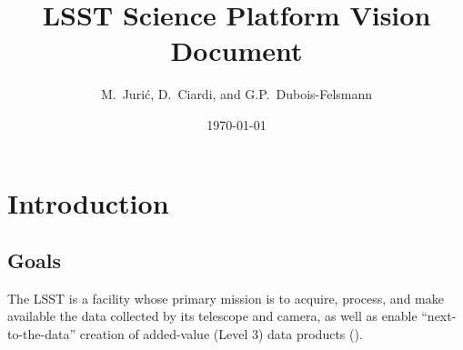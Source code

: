 \documentclass[DM,lsstdraft,toc]{lsstdoc}
\title[LSST Science Platform]{LSST Science Platform Vision Document}
\author{
M.~Juri\'c,
D.~Ciardi,
and
G.P.~Dubois-Felsmann
}
\date{\today}
\begin{document}
\maketitle

%
%
%
%

\section{Introduction}

\subsection{Goals}

The LSST is a facility whose primary mission is to acquire, process, and
make available the data collected by its telescope and camera, as well as
enable ``next-to-the-data'' creation of added-value (Level 3) data products
(\SRD).
\end{document}
